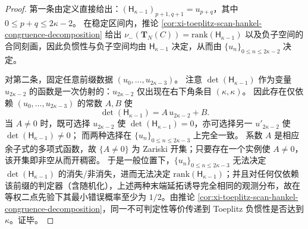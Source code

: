 \begin{proof}
第一条由定义直接给出：\((\mathsf H_{\kappa-1})_{p+1,q+1}=u_{p+q}\)，其中 \(0\le p+q\le 2\kappa-2\)。
在稳定区间内，推论 \ref{cor:xi-toeplitz-scan-hankel-congruence-decomposition} 给出
\(
\nu_-(\mathbf{T}_N(C))=\mathrm{rank}(\mathsf H_{\kappa-1})
\)
以及负子空间的合同刻画，因此负惯性与负子空间均由 \(\mathsf H_{\kappa-1}\) 决定，从而由 \(\{u_n\}_{0\le n\le 2\kappa-2}\) 决定。
\par
对第二条，固定任意前缀数据 \((u_0,\dots,u_{2\kappa-3})\)。
注意 \(\det(\mathsf H_{\kappa-1})\) 作为变量 \(u_{2\kappa-2}\) 的函数是一次仿射的：\(u_{2\kappa-2}\) 仅出现在右下角条目 \((\kappa,\kappa)\)。
因此存在仅依赖 \((u_0,\dots,u_{2\kappa-3})\) 的常数 \(A,B\) 使
\[
\det(\mathsf H_{\kappa-1})=A\,u_{2\kappa-2}+B.
\]
当 \(A\neq 0\) 时，既可选择 \(u_{2\kappa-2}\) 使 \(\det(\mathsf H_{\kappa-1})=0\)，亦可选择另一 \(u'_{2\kappa-2}\) 使 \(\det(\mathsf H_{\kappa-1})\neq 0\)；
而两种选择在 \(\{u_n\}_{0\le n\le 2\kappa-3}\) 上完全一致。
系数 \(A\) 是相应余子式的多项式函数，故 \(\{A\neq 0\}\) 为 Zariski 开集；只要存在一个实例使 \(A\neq 0\)，该开集即非空从而开稠密。
于是一般位置下，\(\{u_n\}_{0\le n\le 2\kappa-3}\) 无法决定 \(\det(\mathsf H_{\kappa-1})\) 的消失/非消失，进而无法决定 \(\mathrm{rank}(\mathsf H_{\kappa-1})\)；并且对任何仅依赖该前缀的判定器（含随机化），上述两种末端延拓诱导完全相同的观测分布，故在等权二点先验下其最小错误概率至少为 \(1/2\)。由推论 \ref{cor:xi-toeplitz-scan-hankel-congruence-decomposition}，同一不可判定性等价传递到 Toeplitz 负惯性是否达到 \(\kappa\)。证毕。
\end{proof}

